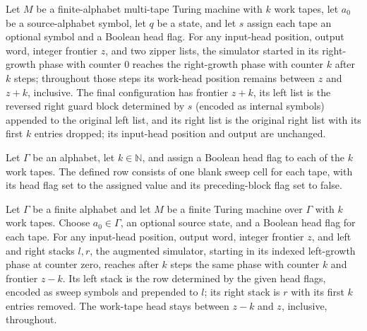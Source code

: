 \begin{lemma}
\label{Turing.FinTM.dg_right_span}
\leanok
{}
Let $M$ be a finite-alphabet multi-tape Turing machine with $k$ work tapes, let $a_0$ be
a source-alphabet symbol, let $q$ be a state, and let $s$ assign each tape an optional
symbol and a Boolean head flag. For any input-head position, output word, integer
frontier $z$, and two zipper lists, the simulator started in its right-growth phase with
counter $0$ reaches the right-growth phase with counter $k$ after $k$ steps; throughout
those steps its work-head position remains between $z$ and $z+k$, inclusive. The final
configuration has frontier $z+k$, its left list is the reversed right guard block
determined by $s$ (encoded as internal symbols) appended to the original left list, and
its right list is the original right list with its first $k$ entries dropped; its
input-head position and output are unchanged.
\end{lemma}

\begin{definition}
\label{Turing.FinTM.dgLeftRow}
\leanok
{}
Let $\Gamma$ be an alphabet, let $k\in\mathbb{N}$, and assign a Boolean head flag to
each of the $k$ work tapes. The defined row consists of one blank sweep cell for each
tape, with its head flag set to the assigned value and its preceding-block flag set to
false.
\end{definition}

\begin{lemma}
\label{Turing.FinTM.dg_left_span}
\leanok
{}
Let $\Gamma$ be a finite alphabet and let $M$ be a finite Turing machine over $\Gamma$
with $k$ work tapes. Choose $a_0\in\Gamma$, an optional source state, and a Boolean head
flag for each tape. For any input-head position, output word, integer frontier $z$, and
left and right stacks $l,r$, the augmented simulator, starting in its indexed
left-growth phase at counter zero, reaches after $k$ steps the same phase with counter
$k$ and frontier $z-k$. Its left stack is the row determined by the given head flags,
encoded as sweep symbols and prepended to $l$; its right stack is $r$ with its first $k$
entries removed. The work-tape head stays between $z-k$ and $z$, inclusive, throughout.
\end{lemma}

